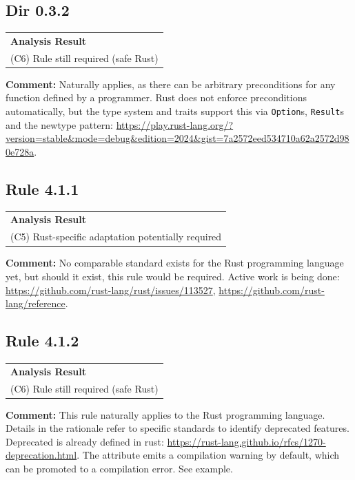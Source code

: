 \subsection*{Dir 0.3.2}
\begin{longtable}{p{13cm}}
\textbf{Analysis Result} \\
(C6) Rule still required (safe Rust) \\
\end{longtable}
\textbf{Comment:} Naturally applies, as there can be arbitrary preconditions for any function defined by a programmer. Rust does not enforce preconditions automatically, but the type system and traits support this via \texttt{Option}s, \texttt{Result}s and the newtype pattern: \url{https://play.rust-lang.org/?version=stable&mode=debug&edition=2024&gist=7a2572eed534710a62a2572d980e728a}. \\
\subsection*{Rule 4.1.1}
\begin{longtable}{p{13cm}}
\textbf{Analysis Result} \\
(C5) Rust-specific adaptation potentially required \\
\end{longtable}
\textbf{Comment:} No comparable standard exists for the Rust programming language yet, but should it exist, this rule would be required. Active work is being done: \url{https://github.com/rust-lang/rust/issues/113527}, \url{https://github.com/rust-lang/reference}. \\
\subsection*{Rule 4.1.2}
\begin{longtable}{p{13cm}}
\textbf{Analysis Result} \\
(C6) Rule still required (safe Rust) \\
\end{longtable}
\textbf{Comment:} This rule naturally applies to the Rust programming language. Details in the rationale refer to specific \Cpp standards to identify deprecated features. Deprecated is already defined in rust: \url{https://rust-lang.github.io/rfcs/1270-deprecation.html}. The attribute emits a compilation warning by default, which can be promoted to a compilation error. See example. \\


